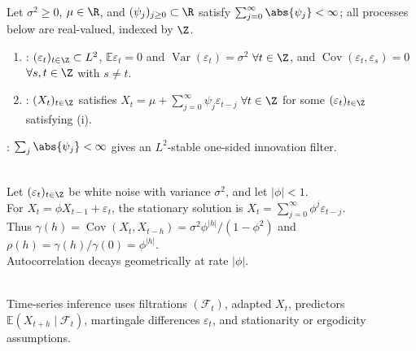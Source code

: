 \begin{definition} \label{def:white-noise-linear-process} \\
Let $\sigma^2\geq0$, $\mu\in\R$, and $(\psi_j)_{j\geq0}\subset\R$ satisfy $\sum_{j=0}^{\infty}\abs{\psi_j}<\infty$; all processes below are real-valued, indexed by $\Z$.
\begin{enumerate}[label=(\roman*)]
\setlength{\itemsep}{0pt}
\item {}: $(\varepsilon_t)_{t\in\Z}\subset L^2$, $\mathbb{E}\varepsilon_t=0$ and $\operatorname{Var}(\varepsilon_t)=\sigma^2$ $\forall t\in\Z$, and $\operatorname{Cov}(\varepsilon_t,\varepsilon_s)=0$ $\forall s,t\in\Z$ with $s\neq t$.
\item {}: $(X_t)_{t\in\Z}$ satisfies $X_t=\mu+\sum_{j=0}^{\infty}\psi_j\varepsilon_{t-j}$ $\forall t\in\Z$ for some $(\varepsilon_t)_{t\in\Z}$ satisfying (i).
\end{enumerate}
: $\sum_j\abs{\psi_j}<\infty$ gives an $L^2$-stable one-sided innovation filter.
\end{definition}

\begin{example} \label{ex:ar-one-stationarity} \\
Let $(\varepsilon_t)_{t\in\Z}$ be white noise with variance $\sigma^2$, and let $|\phi|<1$.\\
For $X_t=\phi X_{t-1}+\varepsilon_t$, the stationary solution is $X_t=\sum_{j=0}^{\infty}\phi^j\varepsilon_{t-j}$.\\
Thus $\gamma(h)=\operatorname{Cov}(X_t,X_{t-h})=\sigma^2\phi^{|h|}/(1-\phi^2)$ and $\rho(h)=\gamma(h)/\gamma(0)=\phi^{|h|}$.\\
Autocorrelation decays geometrically at rate $|\phi|$.
\end{example}

\begin{remark} \label{rem:time-series-prerequisite-stochastic-processes} \\
Time-series inference uses filtrations $(\mathcal{F}_t)$, adapted $X_t$, predictors $\mathbb{E}(X_{t+h}\mid\mathcal{F}_t)$, martingale differences $\varepsilon_t$, and stationarity or ergodicity assumptions.
\end{remark}
